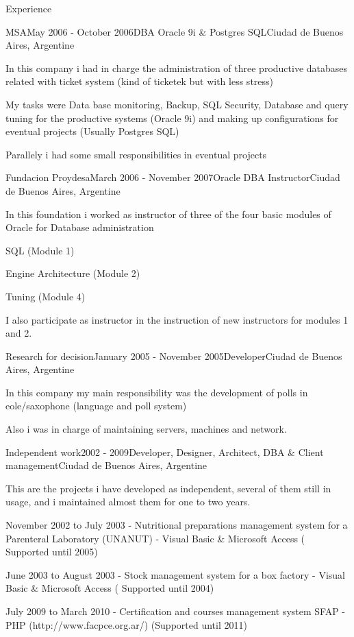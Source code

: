 \documentclass{resume} %
\begin{document}
\begin{rSection}{Experience}
\begin{rSubsection}{MSA}{May 2006 - October 2006}{DBA Oracle 9i \& Postgres SQL}{Ciudad de Buenos Aires, Argentine}
\item In this company i had in charge the administration of three productive databases related with ticket system (kind of ticketek but with less stress) 
\item My tasks were Data base monitoring, Backup, SQL Security, Database and query tuning for the productive systems (Oracle 9i) and making up configurations for eventual projects (Usually Postgres SQL)
\item Parallely i had some small responsibilities in eventual projects 
\end{rSubsection}


\begin{rSubsection}{Fundacion Proydesa}{March 2006 - November 2007}{Oracle DBA Instructor}{Ciudad de Buenos Aires, Argentine}
\item In this foundation i worked as instructor of three of the four basic modules of Oracle for Database administration
\item SQL (Module 1)
\item Engine Architecture (Module 2)
\item Tuning (Module 4)
\item I also participate as instructor in the instruction of new instructors for modules 1 and 2.
\end{rSubsection}

\begin{rSubsection}{Research for decision}{January 2005 - November 2005}{Developer}{Ciudad de Buenos Aires, Argentine}
\item In this company my main responsibility was the development of polls in eole/saxophone (language and poll system)
\item Also i was in charge of maintaining servers, machines and network.
\end{rSubsection}

\begin{rSubsection}{Independent work}{2002 - 2009}{Developer, Designer, Architect, DBA \& Client management}{Ciudad de Buenos Aires, Argentine}
\item This are the projects i have developed as independent, several of them still in usage, and i maintained almost them for one to two years. 
\item  November 2002 to July 2003 - Nutritional preparations management system for a Parenteral Laboratory (UNANUT) -  Visual Basic \& Microsoft Access ( Supported until 2005) 
\item  June 2003 to August 2003 - Stock management system for a box factory  - Visual Basic \& Microsoft Access ( Supported until 2004) 
\item  July 2009 to March 2010 - Certification and courses management system SFAP -  PHP (http://www.facpce.org.ar/)  (Supported until 2011)
\end{rSubsection}




\end{rSection}
\end{document}
